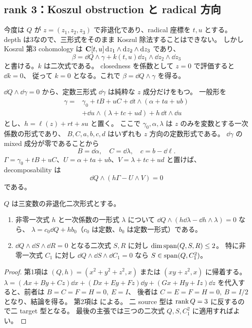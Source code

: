 \documentclass[11pt,a4paper]{ltjsarticle}
\theoremstyle{remark}\newtheorem{remark}[theorem]{注意}\renewcommand{\proofname}{証明}
\begin{document}
\subsection{rank 3：Koszul obstruction と radical 方向}
今度は $Q$ が $z=(z_1,z_2,z_3)$ で非退化であり、radical 座標を $t,u$ とする。
depth は3なので、三形式をそのまま Koszul 除法することはできない。
しかし Koszul 第3 cohomology は
$\mathbf C[t,u]\,\mathrm d z_1\wedge\mathrm d z_2\wedge\mathrm d z_3$ であり、
\[
 \beta=\dd Q\wedge\gamma+k(t,u)\dd z_1\wedge\dd z_2\wedge\dd z_3
\]
と書ける。$k$ は二次式である。
closedness を係数として $z=0$ で評価すると $\dd k=0$、
従って $k=0$ となる。これで $\beta=\dd Q\wedge\gamma$ を得る。

$\dd Q\wedge\dd\gamma=0$ から、定数三形式 $\dd\gamma$ は純粋な $z$ 成分だけをもつ。
一般形を
\begin{align}
 \gamma={}&\gamma_0+tB+uC
 +\dd t\wedge(\alpha+ta+ub)\nonumber\\
 &+\dd u\wedge(\lambda+tc+ud)+h\,\dd t\wedge\dd u \label{eq:rank3gamma}
\end{align}
とし、$h=\ell(z)+rt+su$ と置く。
ここで $\gamma_0,\alpha,\lambda$ は $z$ のみを変数とする一次係数の形式であり、
$B,C,a,b,c,d$ はいずれも $z$ 方向の定数形式である。
$\dd\gamma$ の mixed 成分が零であることから
\[
 B=\dd\alpha,\quad C=\dd\lambda,\quad c=b-\dd\ell.
\]
$\Gamma=\gamma_0+tB+uC$、$U=\alpha+ta+ub$、$V=\lambda+tc+ud$ と置けば、
decomposability は
\begin{equation}\label{eq:rank3dec}
 \dd Q\wedge(h\Gamma-U\wedge V)=0
\end{equation}
である。

\begin{lemma}\label{lem:rank3elem}
$Q$ は三変数の非退化二次形式とする。
\begin{enumerate}
 \item 非零一次式 $h$ と一次係数の一形式 $\lambda$ について
 $\dd Q\wedge(h\dd\lambda-\dd h\wedge\lambda)=0$ なら、
 $\lambda=c_0\dd Q+h b_0$（$c_0$ は定数、$b_0$ は定数一形式）である。
 \item $\dd Q\wedge\dd S\wedge\dd R=0$ となる二次式 $S,R$ に対し
 $\dim\operatorname{span}(Q,S,R)\le2$。
 特に非零一次式 $C_1$ に対し
 $\dd Q\wedge\dd S\wedge\dd C_1=0$ なら
 $S\in\operatorname{span}(Q,C_1^2)$。
\end{enumerate}
\end{lemma}
\begin{proof}
第1項は $(Q,h)=(x^2+y^2+z^2,x)$ または $(xy+z^2,x)$ に帰着する。
$\lambda=(Ax+By+Cz)\dd x+(Dx+Ey+Fz)\dd y+(Gx+Hy+Iz)\dd z$
を代入すると、前者は $B=C=F=H=0,\ E=I$、
後者は $C=E=F=H=0,\ B=I/2$ となり、結論を得る。
第2項は \cite[Theorem 2.1]{DBS} による。
二 source 型は $\operatorname{rank} Q=3$ に反するので二 target 型となる。
最後の主張では三つの二次式 $Q,S,C_1^2$ に適用すればよい。
\end{proof}
\end{document}
